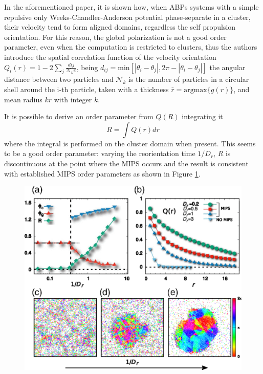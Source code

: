 \documentclass[../../master_thesis_np.tex]{subfiles}
\begin{document}
		In the aforementioned paper, it is shown how, when ABPs systems with a simple repulsive only Weeks-Chandler-Anderson potential phase-separate in a cluster, their velocity tend to form aligned domains, regardless the self propulsion orientation. For this reason, the global polarization is not a good order parameter, even when the computation is restricted to clusters, thus the authors introduce the spatial correlation function of the velocity orientation $Q_i(r) = 1-2\sum_{j} \frac{d{ij}}{\mathcal{N}_k \pi } $, being $d_{ij} = \mathrm{min}\left[|\theta_i - \theta_j|, 2 \pi - |\theta_i - \theta_j| \right]$ the angular distance between two particles and $\mathcal{N}_k$ is the number of particles in a circular shell around the i-th particle, taken with a thickness $\bar{r} = \mathrm{argmax} \{g(r)\}$, and mean radius $k\bar{r}$ with integer $k$. 
		
		It is possible to derive an order parameter from $Q(R)$ integrating it
		\[ 
		R = \int Q(r) dr \]
		where the integral is performed on the cluster domain when present. 
		This seems to be a good order parameter: varying the reorientation time $1/D_r$, $R$ is discontinuous at the point where the MIPS occurs and the result is consistent with established MIPS order parameters as shown in Figure \ref{fig:caprini1}.
		
		\begin{figure}[htp]
			\centering
			\includegraphics[width=\textwidth]{caprini2.png}
			\caption{\cite{caprini_spontaneous_2020}}
			\label{fig:caprini1}
		\end{figure}
		
\end{document}
